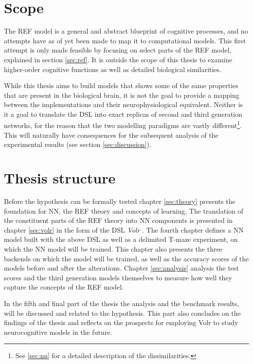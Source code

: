 \documentclass[report.tex]{subfiles}
\begin{document}
\section{Scope} \label{sec:scope}
The \gls{REF} model is a general and abstract blueprint of cognitive
processes, and no attempts have as of yet been made to map it to
computational models.
This first attempt is only made feasible by focusing on select parts
of the \gls{REF} model, explained in section \ref{sec:ref}.
It is outside the scope of this thesis to examine
higher-order cognitive functions as well as detailed biological
similarities.

While this thesis aims to build models that shows some of the same
properties that are present in the biological brain,  
it is not the goal to provide a mapping between the
implementations and their neurophysiological equivalent.
Neither is it a goal to translate the \gls{DSL} into exact replicas
of second and third generation networks, for the reason that the
two modelling paradigms are vastly different\footnote{See \ref{sec:nn}
for a detailed description of the dissimilarities.}.
This will naturally have consequences for the subsequent analysis of the
experimental results (see section \ref{sec:discussion}).

\section{Thesis structure}
Before the hypothesis can be formally tested chapter \ref{sec:theory}
presents the foundation for \gls{NN}, the \gls{REF} theory and
concepts of learning.
The translation of the constituent parts of the \gls{REF} theory
into \gls{NN} components is presented in chapter \ref{sec:volr} in 
the form of the \gls{DSL} \textit{Volr} .
The fourth chapter defines a \gls{NN} model built with the above
\gls{DSL} as well as a delimited T-maze experiment, on which the 
\gls{NN} model will be trained.
This chapter also presents the three \gls{backend}s on which the 
model will be trained, as well as the accuracy scores of the models
before and after the alterations.
Chapter \ref{sec:analysis} analysis the test scores and the third 
generation models themselves to measure how well they capture the
concepts of the \gls{REF} model.

In the fifth and final part of the thesis the analysis and the benchmark
results, will be discussed and related to the hypothesis.
This part also concludes on the findings of the thesis and
reflects on the prospects for employing Volr to study neurocognitive
models in the future.
\end{document}
